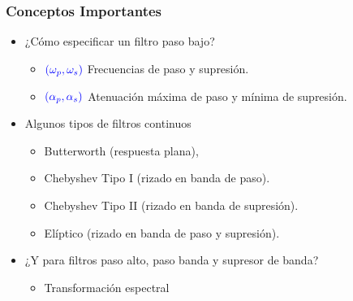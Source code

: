 \documentclass[handout]{beamer}
\author[J. Chacón]{%
\textit{Ingeniería Electrónica de Comunicaciones }\\
\vspace{0.6cm}
\small Jesús Chacón Sombría}%
\institute[DACYA. UCM] %
{

\footnotesize  Departamento de Arquitectura de Computadores y Automática.\\
  Universidad Complutense de Madrid
  }
\date[Diseño de filtros] %
{\footnotesize Curso 2025-2026}%
\newcommand{\MyLogo}{%
\begin{textblock}{14}(116.0,0.6)
  \pgfuseimage{logo}
\end{textblock}
}
\numberwithin{section}{part}
\begin{document}
\begin{frame}
  \titlepage
\end{frame}

\newcommand*\oldmacro{}%
\let\oldmacro\insertshorttitle%
\renewcommand*\insertshorttitle{%
 \MyLogo
  \oldmacro\hfill%
}

\AtBeginSection[]{}
\AtBeginSubsection[]{}

% 
% 
% 

% 
% 

\begin{frame}
  \frametitle{Conceptos Importantes}
  \begin{itemize}
    \item \alert{¿Cómo especificar un filtro paso bajo?}
    \begin{itemize}
      \item $\color{blue}(\omega_p,\omega_s)$ Frecuencias de paso y supresión.
      \item $\color{blue}(\alpha_p,\alpha_s)$ Atenuación máxima de paso y mínima de supresión.
    \end{itemize}
    
    \item \alert{Algunos tipos de filtros continuos}
    \begin{itemize}
      \item Butterworth (respuesta plana),
      \item Chebyshev Tipo I (rizado en banda de paso).
      \item Chebyshev Tipo II (rizado en banda de supresión).
      \item Elíptico (rizado en banda de paso y supresión).
    \end{itemize}

    \item \alert{¿Y para filtros paso alto, paso banda y supresor de banda?}
    \begin{itemize}
      \item Transformación espectral
    \end{itemize}
  \end{itemize}
  
\end{frame}
\end{document}
